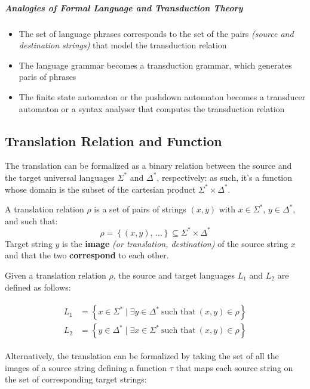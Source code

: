 \documentclass[english]{article}
\begin{document}
\bigskip
\subparagraph*{Analogies of Formal Language and Transduction Theory}

\begin{itemize}
  \item The set of language phrases corresponds to the set of the pairs \textit{(source and destination strings)} that model the transduction relation
  \item The language grammar becomes a transduction grammar, which generates paris of phrases
  \item The finite state automaton or the pushdown automaton becomes a transducer automaton or a syntax analyser that computes the transduction relation
\end{itemize}

\subsection{Translation Relation and Function}

The translation can be formalized as a binary relation between the source and the target universal languages \(\Sigma^\ast\) and \(\Delta^\ast\), respectively:
as such, it's a function whose domain is the subset of the cartesian product \(\Sigma^\ast \times \Delta^\ast\).

A translation relation \(\rho\) is a set of pairs of strings \(\left( x, y \right)\) with \(x \in \Sigma^\ast\), \(y \in \Delta^\ast\), and such that:
\[ \rho = \left\{ \left( x, y \right), \, \ldots \right\} \subseteq \Sigma^\ast \times \Delta^\ast \]
Target string \(y\) is the \textbf{image} \textit{(or translation, destination)} of the source string \(x\) and that the two \textbf{correspond} to each other.

Given a translation relation \(\rho\), the source and target languages \(L_1\) and \(L_2\) are defined as follows:

\begin{gather*}
  \begin{aligned}
    L_1 & = \left\{ x \in \Sigma^\ast \mid \exists y \in \Delta^\ast \ \text{such that} \ \left( x, y \right) \in \rho \right\} \\
    L_2 & = \left\{ y \in \Delta^\ast \mid \exists x \in \Sigma^\ast \ \text{such that} \ \left( x, y \right) \in \rho \right\}
  \end{aligned}
\end{gather*}

Alternatively, the translation can be formalized by taking the set of all the images of a source string defining a function \(\tau\) that maps each source string on the set of corresponding target strings:
\end{document}
